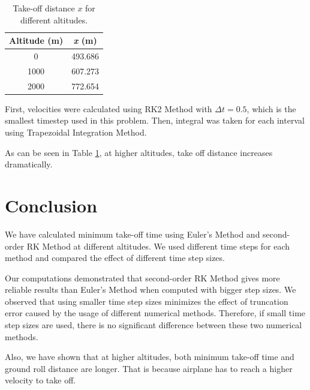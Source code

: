 \documentclass[letterpaper,12pt]{article}
\begin{document}
\begin{table}[!h]
        \begin{center}
        \caption{Take-off distance $x$ for different altitudes.}
        \vspace{1em}
        \label{tbl:takeoff}
        \begin{tabular}{|c|c|} 
        \hline
        \multicolumn{1}{|c|}{\bf{Altitude (m)}} & \multicolumn{1}{c|}{\bf{\textit{x} (m)}} \\
        \hline
        0 &   493.686 \\ \hline
        1000 &   607.273 \\ \hline
        2000 &   772.654 \\ \hline
        \end{tabular}
        \end{center}
\end{table}

First, velocities were calculated using RK2 Method with $\Delta t = 0.5$, which is the smallest
timestep used in this problem. Then, integral was taken for each interval using Trapezoidal Integration Method.

As can be seen in Table \ref{tbl:takeoff}, at higher altitudes, take off distance increases dramatically.

\section{Conclusion}
We have calculated minimum take-off time using Euler's Method and second-order RK Method at different altitudes.
We used different time steps for each method and compared the effect of different time step sizes. 

Our computations demonstrated that second-order RK Method gives more reliable results than Euler's Method
when computed with bigger step sizes. We observed that using smaller time step sizes minimizes the effect of truncation error
caused by the usage of different numerical methods. Therefore, if small time step sizes are used, there is no 
significant difference between these two numerical methods.

Also, we have shown that at higher altitudes, both minimum take-off time and ground roll distance are longer.
That is because airplane has to reach a higher velocity to take off.
\end{document}
